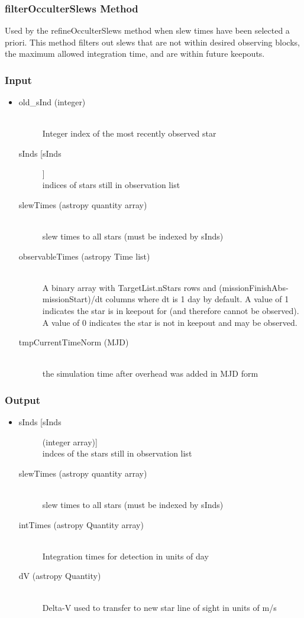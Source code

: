 \documentclass[cleanfoot]{asme2ej}
\begin{document}
\subsubsection{filterOcculterSlews Method} \label{sec:filterOcculterSlewstask}
Used by the refineOcculterSlews method when slew times have been selected a priori. This method filters out slews that are not within desired observing blocks, the maximum allowed integration time, and are within future keepouts.
\subsubsection*{Input}
\begin{itemize}
\item
\begin{description}
    \item[old\_sInd (integer)] \hfill \\ Integer index of the most recently observed star
    \item[sInds [sInds]] \hfill \\ indices of stars still in observation list
    \item[slewTimes (astropy quantity array)] \hfill \\ slew times to all stars (must be indexed by sInds)
    \item[observableTimes (astropy Time list)] \hfill \\ A binary array with TargetList.nStars rows and (missionFinishAbs-missionStart)/dt columns where dt is 1 day by default. A value of 1 indicates the star is in keepout for (and therefore cannot be observed). A value of 0 indicates the star is not in keepout and may be observed.
    \item[tmpCurrentTimeNorm (MJD)] \hfill \\ the simulation time after overhead was added in MJD form
\end{description}
\end{itemize}
\subsubsection*{Output}
\begin{itemize}
\item
\begin{description}
    \item[sInds [sInds] (integer array)] \hfill \\ indces of the stars still in observation list
    \item[slewTimes (astropy quantity array)] \hfill \\ slew times to all stars (must be indexed by sInds)
    \item[intTimes (astropy Quantity array)] \hfill \\ Integration times for detection in units of day
    \item[dV (astropy Quantity)] \hfill \\ Delta-V used to transfer to new star line of sight in units of m/s
    
\end{description}
\end{itemize}
\end{document}

